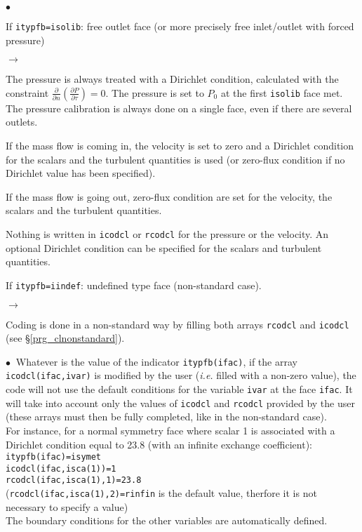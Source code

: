 {{{\begin{list}{$\bullet$}{}
\item If \texttt{itypfb=isolib}: free outlet face (or more precisely free 
      inlet/outlet with forced pressure)
\begin{list}{$\rightarrow$}{}
\item The pressure is always treated with a Dirichlet condition, calculated
      with the constraint $\displaystyle \frac{\partial }{\partial n}\left(\frac{ \partial P}{\partial \tau}\right)=0$.
      The pressure is set to $P_0$ at the first \texttt{isolib} face met.
      The pressure calibration is always done on a single face, even if there are
      several outlets.
\item If the mass flow is coming in, the velocity is set to zero
      and a Dirichlet condition for the scalars and the turbulent quantities is used
      (or zero-flux condition if no Dirichlet value has been specified).
\item If the mass flow is going out, zero-flux condition are set for the velocity,
      the scalars and the turbulent quantities.
\item Nothing is written in \texttt{icodcl} or \texttt{rcodcl} for the pressure or
      the velocity. An optional Dirichlet condition can be specified for the scalars
      and turbulent quantities.
\end{list}

\item If \texttt{itypfb=iindef}: undefined type face (non-standard case).
\begin{list}{$\rightarrow$}{}
\item Coding is done in a non-standard way by filling both arrays \texttt{rcodcl} and
      \texttt{icodcl} (see \S\ref{prg_clnonstandard}).
\end{list}
\end{list}

$\bullet\ $ Whatever is the value of the indicator \texttt{itypfb(ifac)}, if
the array \texttt{icodcl(ifac,ivar)} is modified by the user ({\em i.e.} filled
with a non-zero value), the code will not use the default
conditions for the variable \texttt{ivar} at the face \texttt{ifac}. It will
take into account only the values of \texttt{icodcl} and \texttt{rcodcl} provided by the
user (these arrays must then be fully completed, like in the non-standard case). \\
For instance, for a normal symmetry face where scalar 1 is associated with a
Dirichlet condition equal to 23.8 (with an infinite exchange
coefficient):\\
\hspace*{2cm}\texttt{itypfb(ifac)=isymet}\\
\hspace*{2cm}\texttt{icodcl(ifac,isca(1))=1}\\
\hspace*{2cm}\texttt{rcodcl(ifac,isca(1),1)=23.8}\\
(\texttt{rcodcl(ifac,isca(1),2)=rinfin} is the default value, therfore it is
not necessary to specify a value)\\
The boundary conditions for the other variables are automatically
defined.

}}}
